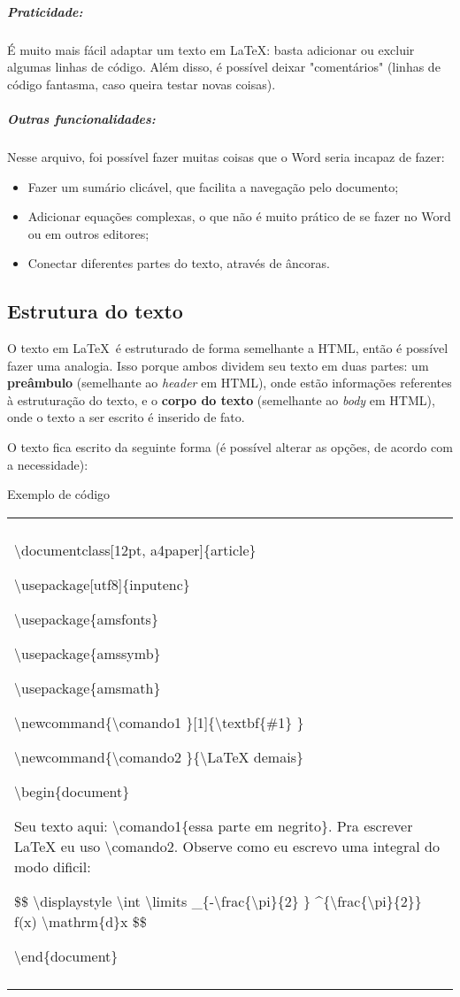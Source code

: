 \documentclass[12pt,a4paper]{article}
\newenvironment{caixa}[1]
    {\begin{center}
    #1\\[1ex]
    \begin{tabular}{|p{0.9\textwidth}|}
    \hline\\
    }
    { 
    \\\\\hline
    \end{tabular} 
    \end{center}
    }
\begin{document}
\subparagraph{Praticidade:} É muito mais fácil adaptar um texto em \LaTeX: basta adicionar ou excluir algumas linhas de código. Além disso, é possível deixar "comentários" (linhas de código fantasma, caso queira testar novas coisas).

\subparagraph{Outras funcionalidades:} Nesse arquivo, foi possível fazer muitas coisas que o Word seria incapaz de fazer:

\begin{itemize}
\item Fazer um sumário clicável, que facilita a navegação pelo documento;
\item Adicionar equações complexas, o que não é muito prático de se fazer no Word ou em outros editores;
\item Conectar diferentes partes do texto, através de âncoras.
\end{itemize}

\subsection{Estrutura do texto}

O texto em \LaTeX \, é estruturado de forma semelhante a HTML, então é possível fazer uma analogia. Isso porque ambos dividem seu texto em duas partes: um \textbf{preâmbulo} (semelhante ao \textit{header} em HTML), onde estão informações referentes à estruturação do texto, e o \textbf{corpo do texto} (semelhante ao \textit{body} em HTML), onde o texto a ser escrito é inserido de fato.

O texto fica escrito da seguinte forma (é possível alterar as opções, de acordo com a necessidade):

\vspace{5mm}
\begin{caixa}{Exemplo de código} 
\textbackslash documentclass[12pt, a4paper]\{article\}

\textbackslash usepackage[utf8]\{inputenc\}

\textbackslash usepackage\{amsfonts\}

\textbackslash usepackage\{amssymb\}

\textbackslash usepackage\{amsmath\}

\textbackslash newcommand\{\textbackslash comando1 \}[1]\{\textbackslash textbf\{\#1\} \}

\textbackslash newcommand\{\textbackslash comando2 \}\{\textbackslash LaTeX demais\}

\vspace{5mm}

\textbackslash begin\{document\}

Seu texto aqui: \textbackslash comando1\{essa parte em negrito\}. Pra escrever LaTeX eu uso \textbackslash comando2. Observe como eu escrevo uma integral do modo dificil: 

\$\$ \textbackslash displaystyle \textbackslash int \textbackslash limits \_\{-\textbackslash frac\{\textbackslash pi\}\{2\} \} \textasciicircum\{\textbackslash frac\{\textbackslash pi\}\{2\}\} f(x) \textbackslash mathrm\{d\}x  \$\$

\textbackslash end\{document\}
\end{caixa}
\end{document}
